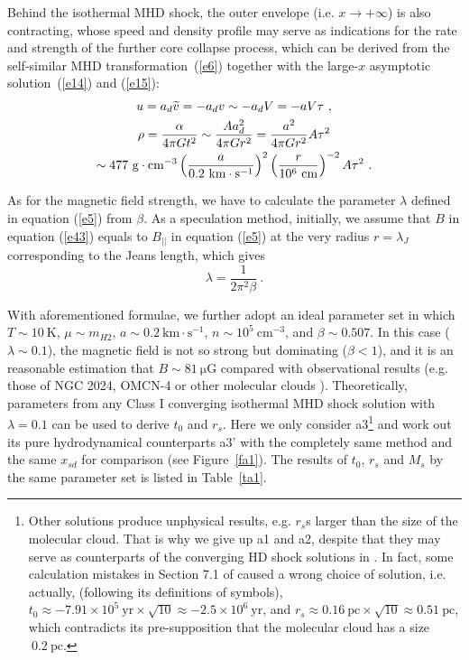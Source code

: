 \documentclass[fleqn,usenatbib]{mnras}
\begin{document}
Behind the isothermal MHD shock, the outer envelope (i.e. $x\rightarrow +\infty$) is also contracting, whose speed and density profile may serve as indications for the rate and strength of the further core collapse process, which can be derived from the self-similar MHD transformation~(\ref{e6}) together with the large-$x$ asymptotic solution~(\ref{e14}) and (\ref{e15}):
\begin{gather}
u=a_{d}\widetilde{v}=-a_{d}v\sim -a_{d}V=-aV\tau\ , \label{e47}\\
\rho=\frac{\alpha}{4\pi Gt^{2}}\sim \frac{A a_{d}^{2}}{4\pi Gr^{2}}=\frac{a^{2}}{4\pi Gr^{2}}A\tau^{2}\notag\\
\sim 477~\mathrm{g\cdot cm^{-3}}\left(\frac{a}{0.2~\mathrm{km\cdot s^{-1}}}\right)^{2}\left(\frac{r}{10^{6}~\mathrm{cm}}\right)^{-2}A\tau^{2}\ .\label{e48}
\end{gather} 

As for the magnetic field strength, we have to calculate the parameter $\lambda$ defined in equation (\ref{e5}) from $\beta$. 
As a speculation method, initially, we assume that $B$ in equation (\ref{e43}) equals to $B_{||}$ in equation (\ref{e5}) at the very radius $r=\lambda_{J}$ corresponding to the Jeans length, which gives
\begin{equation}
\lambda=\frac{1}{2\pi^{2}\beta}\ .
\end{equation}

With aforementioned formulae, we further adopt an ideal parameter set in which $T\sim 10~\mathrm{K}$, $\mu\sim m_{H2}$, $a\sim 0.2~\mathrm{km\cdot s^{-1}}$, $n\sim 10^{5}~\mathrm{cm^{-3}}$, and $\beta\sim 0.507$. In this case ($\lambda\sim 0.1$), the magnetic field is not so strong but dominating ($\beta<1$), and it is an reasonable estimation that $B\sim 81~\mathrm{\mu G}$ compared with observational results (e.g. those of NGC 2024, OMCN-4 \citep{crutcher1999magnetic} or other molecular clouds \citep{bourke2001new}). Theoretically, parameters from any Class I converging isothermal MHD shock solution with $\lambda=0.1$ can be used to derive $t_{0}$ and $r_{s}$. Here we only consider a3\footnote{Other solutions produce unphysical results, e.g. $r_{s}$s larger than the size of the molecular cloud. That is why we give up a1 and a2, despite that they may serve as counterparts of the converging HD shock solutions in \citet{lou2014self}. In fact, some calculation mistakes in Section 7.1 of \citet{lou2014self} caused a wrong choice of solution, i.e. actually, (following its definitions of symbols), $t_{0}\approx -7.91\times 10^{5}~\mathrm{yr} \times\sqrt{10}\approx -2.5\times 10^{6}~\mathrm{yr}$, and $r_{s}\approx 0.16~\mathrm{pc}\times \sqrt{10}\approx 0.51~\mathrm{pc}$, which contradicts its pre-supposition that the molecular cloud has a size$~0.2~\mathrm{pc}$.} and work out its pure hydrodynamical counterparts a3' with the completely same method and the same $x_{sd}$ for comparison (see Figure~\ref{fa1}). The results of $t_{0}$, $r_{s}$ and $M_{s}$ by the same parameter set is listed in Table~\ref{ta1}.
\end{document}

